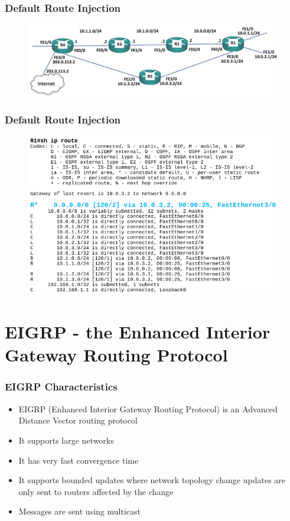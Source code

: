 \documentclass[pdflatex,compress,mathserif]{beamer}
\begin{document}
\begin{frame}
	\frametitle{Default Route Injection}
	\begin{figure}
		\centering
		\includegraphics[width=\linewidth]{img/img08}
	\end{figure}
\end{frame}

\begin{frame}
	\frametitle{Default Route Injection}
	\begin{figure}
		\centering
		\includegraphics[width=\linewidth]{img/img09}
	\end{figure}
\end{frame}

\section{EIGRP - the Enhanced Interior Gateway Routing Protocol}

\begin{frame}
	\frametitle{EIGRP Characteristics}
	\begin{itemize}
		\item EIGRP (Enhanced Interior Gateway Routing Protocol) is an
Advanced Distance Vector routing protocol
		\item It supports large networks
		\item It has very fast convergence time
		\item It supports bounded updates where network topology change
updates are only sent to routers affected by the change
		\item Messages are sent using multicast
	\end{itemize}
\end{frame}
\end{document}
